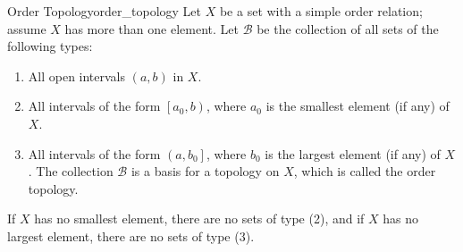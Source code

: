 \begin{definition}
{Order Topology}{order_topology}
Let \(X\) be a set with a simple order relation; assume \(X\) has more than one
element. Let \(\mathcal{B}\) be the collection of all sets of the following
types:
\begin{enumerate}
    \item All open intervals \((a, b)\) in \(X\).
    \item All intervals of the form \(\left[a_{0}, b\right)\), where \(a_{0}\)
    is the smallest element (if any) of \(X\).
    \item All intervals of the form \(\left(a, b_{0}\right]\), where \(b_{0}\)
    is the largest element (if any) of \(X\). The collection \(\mathcal{B}\) is
    a basis for a topology on \(X\), which is called the order topology.
\end{enumerate}
If \(X\) has no smallest element, there are no sets of type (2), and if \(X\)
has no largest element, there are no sets of type (3).
\end{definition}
